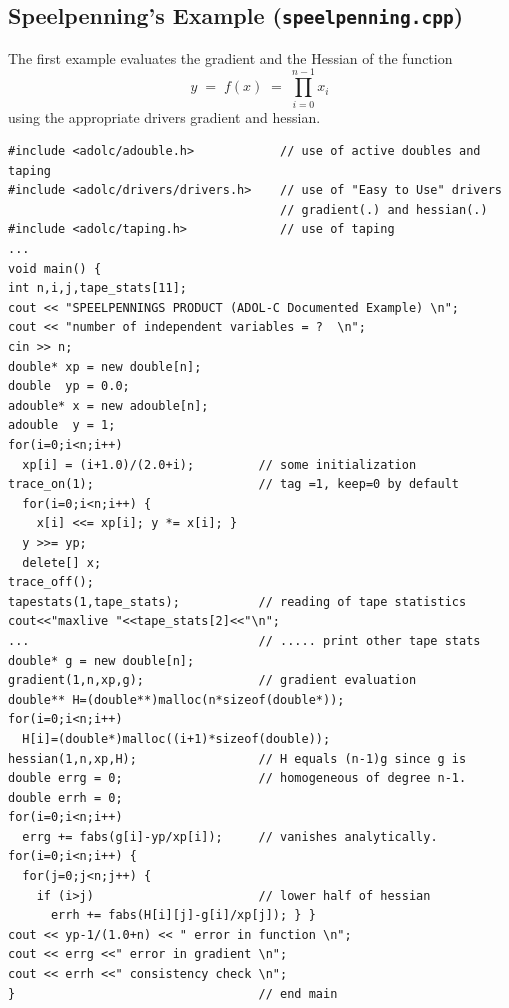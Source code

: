 \documentclass[11pt,twoside]{article}
\begin{document}
\subsection{Speelpenning's Example ({\tt speelpenning.cpp})}
%
The first example evaluates the gradient and the Hessian of
the function
\[ 
y \; = \; f(x)\; =\; \prod_{i=0}^{n-1} x_i 
\] 
using the appropriate drivers {\sf gradient} and {\sf hessian}.

\begin{verbatim}
#include <adolc/adouble.h>            // use of active doubles and taping
#include <adolc/drivers/drivers.h>    // use of "Easy to Use" drivers 
                                      // gradient(.) and hessian(.)
#include <adolc/taping.h>             // use of taping
...
void main() {
int n,i,j,tape_stats[11];
cout << "SPEELPENNINGS PRODUCT (ADOL-C Documented Example) \n";
cout << "number of independent variables = ?  \n";
cin >> n;
double* xp = new double[n];          
double  yp = 0.0;
adouble* x = new adouble[n];      
adouble  y = 1;
for(i=0;i<n;i++)
  xp[i] = (i+1.0)/(2.0+i);         // some initialization
trace_on(1);                       // tag =1, keep=0 by default
  for(i=0;i<n;i++) {
    x[i] <<= xp[i]; y *= x[i]; }      
  y >>= yp;
  delete[] x;                      
trace_off();
tapestats(1,tape_stats);           // reading of tape statistics
cout<<"maxlive "<<tape_stats[2]<<"\n";
...                                // ..... print other tape stats
double* g = new double[n];        
gradient(1,n,xp,g);                // gradient evaluation
double** H=(double**)malloc(n*sizeof(double*));
for(i=0;i<n;i++)
  H[i]=(double*)malloc((i+1)*sizeof(double)); 
hessian(1,n,xp,H);                 // H equals (n-1)g since g is
double errg = 0;                   // homogeneous of degree n-1.
double errh = 0;
for(i=0;i<n;i++)
  errg += fabs(g[i]-yp/xp[i]);     // vanishes analytically.
for(i=0;i<n;i++) {
  for(j=0;j<n;j++) {
    if (i>j)                       // lower half of hessian
      errh += fabs(H[i][j]-g[i]/xp[j]); } }
cout << yp-1/(1.0+n) << " error in function \n";
cout << errg <<" error in gradient \n";
cout << errh <<" consistency check \n";
}                                  // end main
\end{verbatim}
%
\end{document}
